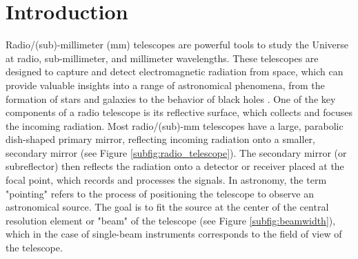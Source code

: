 \section{Introduction}
Radio/(sub)-millimeter (mm) telescopes are powerful tools to study the Universe at radio, sub-millimeter, and millimeter wavelengths.
These telescopes are designed to capture and detect electromagnetic radiation from space, which can provide valuable insights into a range of astronomical phenomena,
from the formation of stars \cite{Haarsma2000} and galaxies \cite{Breugel1999} to the behavior of black holes \cite{Coriat2011}.
One of the key components of a radio telescope is its reflective surface, which collects and focuses the incoming radiation.
Most radio/(sub)-mm telescopes have a large, parabolic dish-shaped primary mirror, reflecting incoming radiation onto a smaller, secondary mirror (see Figure \ref{subfig:radio_telescope}).
The secondary mirror (or subreflector) then reflects the radiation onto a detector or receiver placed at the focal point, which records and processes the signals.
In astronomy, the term "pointing" refers to the process of positioning the telescope to observe an astronomical source.
The goal is to fit the source at the center of the central resolution element or "beam" of the telescope (see Figure \ref{subfig:beamwidth}),
which in the case of single-beam instruments corresponds to the field of view of the telescope.\\

